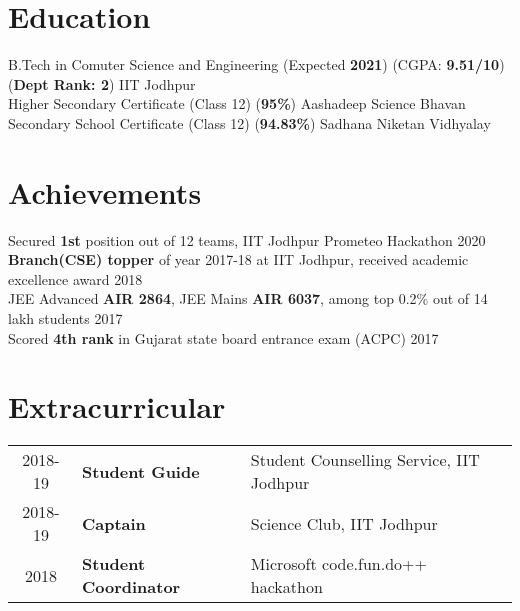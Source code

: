 \documentclass[a4paper]{single-column}
\begin{document}
\vspace{\topsep}
\begin{infos}
\end{infos}

\vspace{\topsep}
\begin{infos}
\end{infos}

\vspace{\topsep}
\begin{infos}
\end{infos}

\section{Education}
  B.Tech in Comuter Science and Engineering (Expected \textbf{2021}) (CGPA: \textbf{9.51/10}) (\textbf{Dept Rank: 2})
  \hfill IIT Jodhpur \\
  Higher Secondary Certificate (Class 12) (\textbf{95\%})
  \hfill Aashadeep Science Bhavan \\
  Secondary School Certificate (Class 12) (\textbf{94.83\%})
  \hfill Sadhana Niketan Vidhyalay \\

\sectionsep
\section{Achievements}
{Secured \textbf{1st} position out of 12 teams, IIT Jodhpur Prometeo Hackathon \hfill 2020}\\
{\textbf{Branch(CSE) topper} of year 2017-18 at IIT Jodhpur, received academic excellence award \hfill 2018}\\
{JEE Advanced \textbf{AIR 2864}, JEE Mains \textbf{AIR 6037}, among top 0.2\% out of 14 lakh students \hfill 2017}\\
{Scored \textbf{4th rank} in Gujarat state board entrance exam (ACPC) \hfill 2017}

\sectionsep
\section{Extracurricular}
\begin{tabular}{ c l l }
2018-19 & \textbf{Student Guide} & Student Counselling Service, IIT Jodhpur \\
2018-19 & \textbf{Captain} & Science Club, IIT Jodhpur \\
2018  & \textbf{Student Coordinator} & Microsoft code.fun.do++ hackathon\\ 
\end{tabular}
\end{document}
